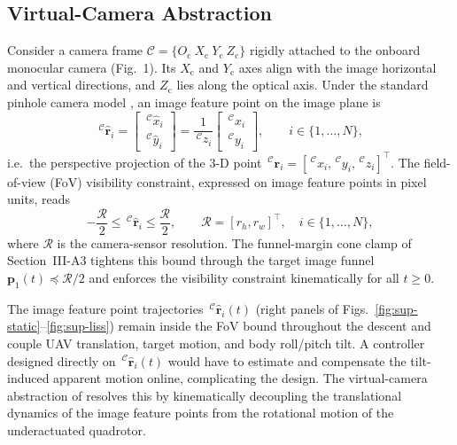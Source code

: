 \documentclass[10pt,journal]{IEEEtran}
\begin{document}
\subsection{Virtual-Camera Abstraction}
\label{sup:virtual_features}
Consider a camera frame $\mathcal{C}=\{O_{\text{c}}~X_{\text{c}}~Y_{\text{c}}~Z_{\text{c}}\}$ rigidly attached to the onboard monocular camera (Fig.~1). Its $X_{\text{c}}$ and $Y_{\text{c}}$ axes align with the image horizontal and vertical directions, and $Z_{\text{c}}$ lies along the optical axis. Under the standard pinhole camera model \cite{chaumette2006}, an image feature point on the image plane is
\begin{equation}
\label{sup:pinhole camera model}
    \,^\mathcal{C}\hat{\boldsymbol{r}}_i = \begin{bmatrix} \,^\mathcal{C}\hat{x}_i \\ \,^\mathcal{C}\hat{y}_i \end{bmatrix}
    = \frac{1}{\,^\mathcal{C}z_i}\begin{bmatrix} \,^\mathcal{C}x_i \\ \,^\mathcal{C}y_i \end{bmatrix},\qquad i\in\{1,\ldots,N\},
\end{equation}
i.e.\ the perspective projection of the 3-D point $\,^\mathcal{C}\boldsymbol{r}_i=[\,^\mathcal{C}x_i,\,^\mathcal{C}y_i,\,^\mathcal{C}z_i]^{\top}$. The field-of-view (FoV) visibility constraint, expressed on image feature points in pixel units, reads
\begin{equation} \label{sup:visibility_constraints}
    -\frac{\mathcal{R}}{2} \le \,^\mathcal{C}\hat{\boldsymbol{r}}_i \le \frac{\mathcal{R}}{2},\qquad \mathcal{R}=[r_h,r_w]^\top,\quad i\in\{1,\ldots,N\},
\end{equation}
where $\mathcal{R}$ is the camera-sensor resolution. The funnel-margin cone clamp of Section~III-A3 tightens this bound through the target image funnel $\boldsymbol{p}_1(t)\preceq\mathcal{R}/2$ and enforces the visibility constraint kinematically for all $t\ge 0$.

The image feature point trajectories $\,^\mathcal{C}\hat{\boldsymbol{r}}_i(t)$ (right panels of Figs.~\ref{fig:sup-static}--\ref{fig:sup-liss}) remain inside the FoV bound throughout the descent and couple UAV translation, target motion, and body roll/pitch tilt. A controller designed directly on $\,^\mathcal{C}\hat{\boldsymbol{r}}_i(t)$ would have to estimate and compensate the tilt-induced apparent motion online, complicating the design. The virtual-camera abstraction of \cite{fink2017, xie2016_2} resolves this by kinematically decoupling the translational dynamics of the image feature points from the rotational motion of the underactuated quadrotor.
\end{document}
